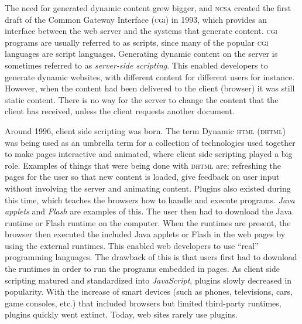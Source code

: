 \documentclass[a4paper,11pt]{kth-mag}
\begin{document}
        The need for generated dynamic content grew bigger, and \textsc{ncsa} created the first draft of the Common Gateway Interface (\textsc{cgi}) in 1993, which provides an interface between the web server and the systems that generate content.
        \textsc{cgi} programs are usually referred to as scripts, since many of the popular \textsc{cgi} languages are script languages.
        Generating dynamic content on the server is sometimes referred to as \emph{server-side scripting}.
        This enabled developers to generate dynamic websites, with different content for different users for instance.
        However, when the content had been delivered to the client (browser) it was still static content.
        There is no way for the server to change the content that the client has received, unless the client requests another document.

        Around 1996, client side scripting was born.
        The term Dynamic \textsc{html} (\textsc{dhtml}) was being used as an umbrella term for a collection of technologies used together to make pages interactive and animated, where client side scripting played a big role.
        Examples of things that were being done with \textsc{dhtml} are; refreshing the pages for the user so that new content is loaded, give feedback on user input without involving the server and animating content.
        Plugins also existed during this time, which teaches the browsers how to handle and execute programs.
        \emph{Java applets} and \emph{Flash} are examples of this. 
        The user then had to download the Java runtime or Flash runtime on the computer.
        When the runtimes are present, the browser then executed the included Java applets or Flash in the web pages by using the external runtimes.
        This enabled web developers to use ``real'' programming languages.
        The drawback of this is that users first had to download the runtimes in order to run the programs embedded in pages.
        As client side scripting matured and standardized into \emph{JavaScript}, plugins slowly decreased in popularity.
        With the increase of smart devices (such as phones, televisions, cars, game consoles, etc.) that included browsers but limited third-party runtimes, plugins quickly went extinct.
        Today, web sites rarely use plugins.
\end{document}
